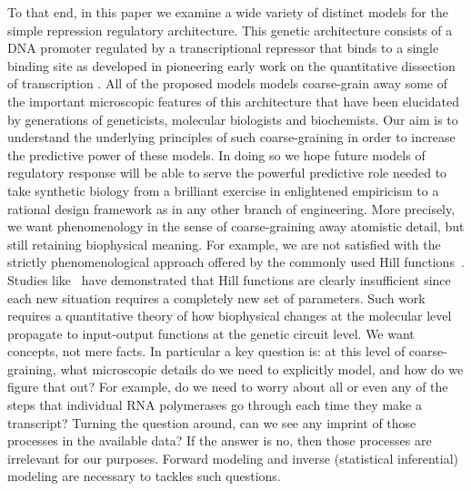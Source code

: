 To that end, in this paper we examine a wide variety of distinct models for the
simple repression regulatory architecture. This genetic architecture consists of
a DNA promoter regulated by a transcriptional repressor that binds to a single
binding site as developed in pioneering early work on the quantitative
dissection of transcription \cite{Oehler1994, Oehler1990}. All of the proposed
models models coarse-grain away some of the important microscopic features of
this architecture that have been elucidated by generations of geneticists,
molecular biologists and biochemists. Our aim is to understand the underlying
principles of such coarse-graining in order to increase the predictive power of
these models. In doing so we hope future models of regulatory response will be
able to serve the powerful predictive role needed to take synthetic biology from
a brilliant exercise in enlightened empiricism to a rational design framework as
in any other branch of engineering. More precisely, we want phenomenology in the
sense of coarse-graining away atomistic detail, but still retaining biophysical
meaning. For example, we are not satisfied with the strictly phenomenological
approach offered by the commonly used Hill functions~\cite{Frank2013}. Studies
like~\cite{Razo-Mejia2018} have demonstrated that Hill functions are clearly
insufficient since each new situation requires a completely new set of
parameters. Such work requires a quantitative theory of how biophysical changes
at the molecular level propagate to input-output functions at the genetic
circuit level. We want concepts, not mere facts. In particular a key question
is: at this level of coarse-graining, what microscopic details do we need to
explicitly model, and how do we figure that out? For example, do we need to
worry about all or even any of the steps that individual RNA polymerases go
through each time they make a transcript? Turning the question around, can we
see any imprint of those processes in the available data? If the answer is no,
then those processes are irrelevant for our purposes. Forward modeling and
inverse (statistical inferential) modeling are necessary to tackles such
questions.


